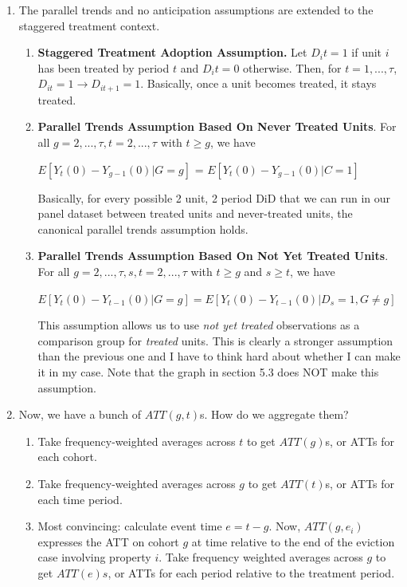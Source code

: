 \documentclass[12pt]{article}
\begin{document}
\begin{enumerate}
\begin{enumerate}
        \end{enumerate}
        \item The parallel trends and no anticipation assumptions are extended to the staggered treatment context.
            \begin{enumerate}
                \item \textbf{Staggered Treatment Adoption Assumption.} Let $D_it=1$ if unit $i$ has been treated by period $t$ and $D_it=0$ otherwise. Then, for $t=1,...,\tau$, $D_{it}=1 \rightarrow D_{it+1} = 1$. Basically, once a unit becomes treated, it stays treated.
                
                \item \textbf{Parallel Trends Assumption Based On Never Treated Units}. For all $g=2,...,\tau, t=2,...,\tau$ with $t\geq g$, we have

                $E[Y_t(0)-Y_{g-1}(0)|G=g]$ = $E[Y_t(0)-Y_{g-1}(0)|C=1]$

                Basically, for every possible 2 unit, 2 period DiD that we can run in our panel dataset between treated units and never-treated units, the canonical parallel trends assumption holds.
                
                
                \item \textbf{Parallel Trends Assumption Based On Not Yet Treated Units}. For all $g=2,...,\tau, s, t=2,...,\tau$ with $t \geq g$ and $s \geq t$, we have

                $E[Y_t(0) - Y_{t-1}(0)|G=g] = E[Y_t(0) - Y_{t-1}(0)|D_s=1, G \neq g]$

                This assumption allows us to use \emph{not yet treated} observations as a comparison group for \emph{treated} units. This is clearly a stronger assumption than the previous one and I have to think hard about whether I can make it in my case. Note that the graph in section 5.3 does NOT make this assumption.

                

                
            \end{enumerate}
        \item Now, we have a bunch of $ATT(g, t)$s. How do we aggregate them?
            \begin{enumerate}
                \item Take frequency-weighted averages across $t$ to get $ATT(g)$s, or ATTs for each cohort.
                \item Take frequency-weighted averages across $g$ to get $ATT(t)$s, or ATTs for each time period.
                \item Most convincing: calculate event time $e = t - g$. Now, $ATT(g, e_i)$ expresses the ATT on cohort $g$ at time relative to the end of the eviction case involving property $i$. Take frequency weighted averages across $g$ to get $ATT(e)s$, or ATTs for each period relative to the treatment period.
            \end{enumerate}
    \end{enumerate}
\end{document}
